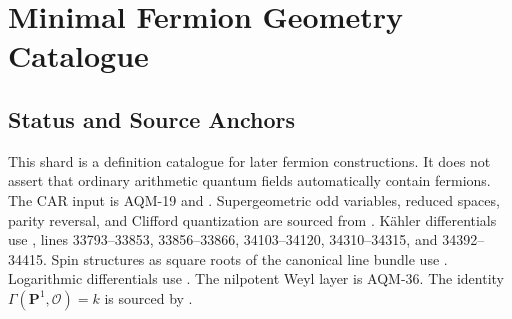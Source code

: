 
\section{Minimal Fermion Geometry Catalogue}
\label{sec:minimal-fermion-geometry-catalogue}

\subsection{Status and Source Anchors}
This shard is a definition catalogue for later fermion constructions.  It
does not assert that ordinary arithmetic quantum fields automatically contain
fermions.  The CAR input is AQM-19 and
.  Supergeometric odd variables,
reduced spaces, parity reversal, and Clifford quantization are sourced from
.  K\"ahler differentials use
, lines
33793--33853, 33856--33866, 34103--34120, 34310--34315, and 34392--34415.
Spin structures as square roots of the canonical line bundle use
.  Logarithmic differentials use
.  The nilpotent Weyl layer is
AQM-36.  The identity \(\Gamma(\mathbf P^1,\mathcal O)=k\) is sourced by
.

